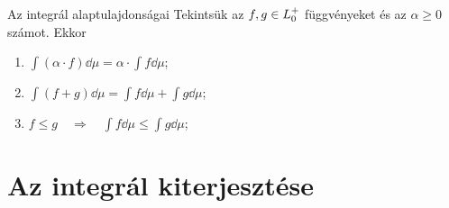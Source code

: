 \documentclass[
]{elteikthesis}[2024/04/26]
\begin{document}
	\begin{theorem}{Az integrál alaptulajdonságai}{}
		Tekintsük az \( f, g \in \StepFuncPlus \) függvényeket és az \( \alpha \geq 0 \) számot. 
		Ekkor
		\begin{enumerate}
			\item \( \displaystyle \int (\alpha \cdot f) \dd{\mu} = \alpha \cdot \int f \dd{\mu} \);
			\item \( \displaystyle \int (f + g) \dd{\mu} = \int f \dd{\mu} + \int g \dd{\mu} \);
			\item \( \displaystyle f \leq g \quad \Longrightarrow \quad \int f \dd{\mu} \leq \int g \dd{\mu} \);
		\end{enumerate}
	\end{theorem}
	
	\newpage
	\section{Az integrál kiterjesztése}
	
\end{document}
